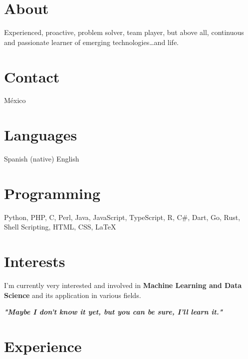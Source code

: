 \documentclass[]{friggeri-cv}
\begin{document}

\begin{aside} %
    \section{About}
    Experienced, proactive, problem solver, team player, but above all, continuous and passionate learner of emerging technologies\ldots and life.
    ~
    \section{Contact}
    {\faMapMarker} México
    ~
    ~{\nfURL}
    ~{\nfURL}
    ~{\nfURL}
    ~{\nfURL}
    ~{\nfURL}
    ~{\nfURL}
    ~{\nfURL}
    ~{\nfURL}
    ~{\nfURL}
    ~{\nfURL}
    ~
    \section{Languages}
    Spanish (native)
    English
    ~
    \section{Programming}
    Python, PHP, C, Perl, Java, JavaScript, TypeScript, R, C\#, Dart, Go, Rust, Shell Scripting, HTML, CSS, {\LaTeX}
    ~
    \section{Interests}
    I’m currently very interested and involved in \textbf{Machine Learning and Data Science} and its application in various fields.
\end{aside}

\begin{center}
    \large{\textbf{\textit{"Maybe I don't know it yet, but you can be sure, I'll learn it."}}}
\end{center}

\section{Experience}
\end{document}
